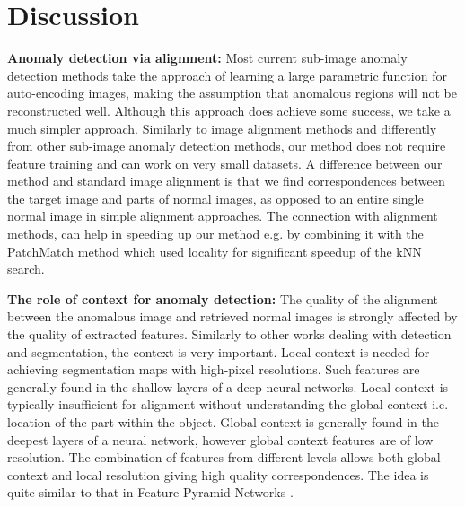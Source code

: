 \documentclass[runningheads]{llncs}
\begin{document}
\section{Discussion}
\label{sec:disc}

\textbf{Anomaly detection via alignment:} Most current sub-image anomaly detection methods take the approach of learning a large parametric function for auto-encoding images, making the assumption that anomalous regions will not be reconstructed well. Although this approach does achieve some success, we take a much simpler approach. Similarly to image alignment methods and differently from other sub-image anomaly detection methods, our method does not require feature training and can work on very small datasets. A difference between our method and standard image alignment is that we find correspondences between the target image and parts of  normal images, as opposed to an entire single normal image in simple alignment approaches. The connection with alignment methods, can help in speeding up our method e.g. by combining it with the PatchMatch \cite{barnes2009patchmatch} method which used locality for significant speedup of the kNN search.    

\textbf{The role of context for anomaly detection:} The quality of the alignment between the anomalous image and retrieved normal images is strongly affected by the quality of extracted features. Similarly to other works dealing with detection and segmentation, the context is very important. Local context is needed for achieving segmentation maps with high-pixel resolutions. Such features are generally found in the shallow layers of a deep neural networks. Local context is typically insufficient for alignment without understanding the global context i.e. location of the part within the object. Global context is generally found in the deepest layers of a neural network, however global context features are of low resolution. The combination of features from different levels allows both global context and local resolution giving high quality correspondences. The idea is quite similar to that in Feature Pyramid Networks \cite{lin2017feature}. 
\end{document}
